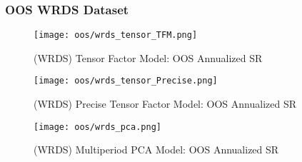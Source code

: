 \subsubsection{OOS WRDS Dataset}

\begin{figure}[H]
    \centering
    \texttt{[image: oos/wrds\_tensor\_TFM.png]}
    \caption{(WRDS) Tensor Factor Model: OOS Annualized SR}
    \label{fig:wrds-oos-tfm}
\end{figure}

\begin{figure}[H]
    \centering
    \texttt{[image: oos/wrds\_tensor\_Precise.png]}
    \caption{(WRDS) Precise Tensor Factor Model: OOS Annualized SR}
    \label{fig:wrds-oos-precise}
\end{figure}


\begin{figure}[H]
    \centering
    \texttt{[image: oos/wrds\_pca.png]}
    \caption{(WRDS) Multiperiod PCA Model: OOS Annualized SR}
    \label{fig:wrds-oos-pca}
\end{figure}
